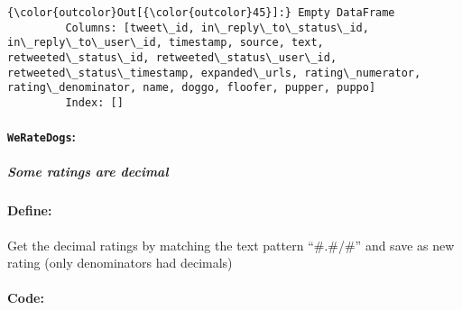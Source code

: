 \documentclass[11pt]{article}
\begin{document}
\begin{Verbatim}[commandchars=\\\{\}]
{\color{outcolor}Out[{\color{outcolor}45}]:} Empty DataFrame
         Columns: [tweet\_id, in\_reply\_to\_status\_id, in\_reply\_to\_user\_id, timestamp, source, text, retweeted\_status\_id, retweeted\_status\_user\_id, retweeted\_status\_timestamp, expanded\_urls, rating\_numerator, rating\_denominator, name, doggo, floofer, pupper, puppo]
         Index: []
\end{Verbatim}
            
    \hypertarget{weratedogs}{%
\paragraph{\texorpdfstring{\texttt{WeRateDogs}:}{WeRateDogs:}}\label{weratedogs}}

\hypertarget{some-ratings-are-decimal}{%
\subparagraph{Some ratings are decimal}\label{some-ratings-are-decimal}}

\hypertarget{define}{%
\paragraph{Define:}\label{define}}

Get the decimal ratings by matching the text pattern ``\#.\#/\#'' and
save as new rating (only denominators had decimals)

\hypertarget{code}{%
\paragraph{Code:}\label{code}}
\end{document}

